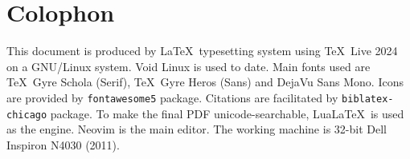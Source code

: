 \clearpage
{}
{}
\chapter*{Colophon}

This document is produced by \LaTeX\ typesetting system using \TeX\ Live 2024 on a GNU/Linux system. Void Linux is used to date. Main fonts used are \TeX\ Gyre Schola (Serif), \TeX\ Gyre Heros (Sans) and DejaVu Sans Mono. Icons are provided by \texttt{fontawesome5} package. Citations are facilitated by \texttt{biblatex-chicago} package. To make the final PDF unicode-searchable, Lua\LaTeX\ is used as the engine. Neovim is the main editor. The working machine is 32-bit Dell Inspiron N4030 (2011).
